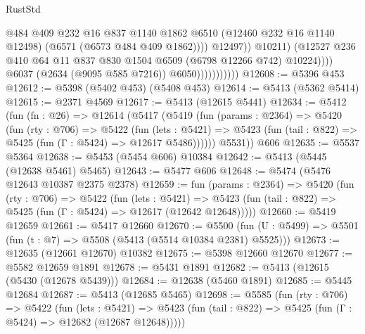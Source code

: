 \begin{lexlean}{RustStd}
\begin{coremodule}
                                          @484
                                          @409
                                          @232
                                          @16
                                          @837
                                          @1140
                                          @1862
                                          @6510
                                          (@12460 @232 @16 @1140 @12498)
                                          (@6571 (@6573 @484 @409 @1862))))
                                      @12497))
                                  @10211)
                                (@12527
                                  @236
                                  @410
                                  @64
                                  @11
                                  @837
                                  @830
                                  @1504
                                  @6509
                                  (@6798 @12266 @742)
                                  @10224))))
                          @6037
                          (@2634 (@9095 @585 @7216))
                          @6050)))))))))))
@12608 := @5396 @453
@12612 := @5398 (@5402 @453) (@5408 @453)
@12614 := @5413 (@5362 @5414)
@12615 := @2371 @4569
@12617 := @5413 (@12615 @5441)
@12634 := @5412
    (fun (fn : @26) =>
    @12614
      (@5417
        (@5419
          (fun (params : @2364) =>
          @5420
            (fun (rty : @706) =>
            @5422
              (fun (lets : @5421) =>
              @5423 (fun (tail : @822) => @5425 (fun (Γ : @5424) => @12617 @5486))))))
        @5531))
    @606
@12635 := @5537 @5364
@12638 := @5453 (@5454 @606) @10384
@12642 := @5413 (@5445 (@12638 @5461) @5465)
@12643 := @5477 @606
@12648 := @5474 (@5476 @12643 @10387 @2375 @2378)
@12659 := fun (params : @2364) =>
  @5420
    (fun (rty : @706) =>
    @5422
      (fun (lets : @5421) =>
      @5423 (fun (tail : @822) => @5425 (fun (Γ : @5424) => @12617 (@12642 @12648)))))
@12660 := @5419 @12659
@12661 := @5417 @12660
@12670 := @5500
    (fun (U : @5499) => @5501 (fun (t : @7) => @5508 (@5413 (@5514 @10384 @2381) @5525)))
@12673 := @12635 (@12661 @12670) @10382
@12675 := @5398 @12660 @12670
@12677 := @5582 @12659 @1891
@12678 := @5431 @1891
@12682 := @5413 (@12615 (@5430 (@12678 @5439)))
@12684 := @12638 (@5460 @1891)
@12685 := @5445 @12684
@12687 := @5413 (@12685 @5465)
@12698 := @5585
    (fun (rty : @706) =>
    @5422
      (fun (lets : @5421) =>
      @5423 (fun (tail : @822) => @5425 (fun (Γ : @5424) => @12682 (@12687 @12648)))))

\end{coremodule}
\end{lexlean}
